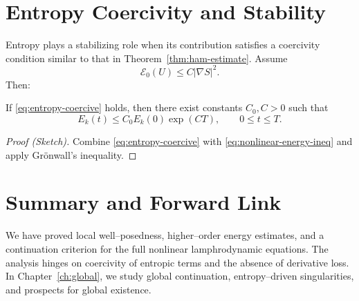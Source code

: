 \section{Entropy Coercivity and Stability}
\label{sec:entropy-coercive}

Entropy plays a stabilizing role when its contribution satisfies a
coercivity condition similar to that in
Theorem~\ref{thm:ham-estimate}.
Assume
\begin{equation}
\label{eq:entropy-coercive}
\mathscr{E}_{0}(U)\le C|\nabla S|^{2}.
\end{equation}
Then:

\begin{proposition}
\label{prop:stability}
If \eqref{eq:entropy-coercive} holds, then there exist constants
$C_{0},C>0$ such that
\[
E_{k}(t) \le C_{0}E_{k}(0)\exp(CT),
\qquad 0\le t\le T.
\]
\end{proposition}

\begin{proof}[Proof (Sketch)]
Combine \eqref{eq:entropy-coercive} with
\eqref{eq:nonlinear-energy-ineq}
and apply Gr\"onwall’s inequality.
\end{proof}



\section{Summary and Forward Link}
\label{sec:summary10}

We have proved local well--posedness, higher--order energy estimates,
and a continuation criterion for the full nonlinear lamphrodynamic
equations.  The analysis hinges on coercivity of entropic terms and
the absence of derivative loss.  In Chapter~\ref{ch:global}, we study
global continuation, entropy--driven singularities, and prospects for
global existence.

